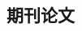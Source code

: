 \documentclass[11pt]{moderncv}
\newcounter{count}
\begin{document}
\begin{CJK*}{UTF8}{gbsn}
%
%
%
%
%
%
%



\section{期刊论文}\setcounter{count}{1}


\end{CJK*}
\end{document}
